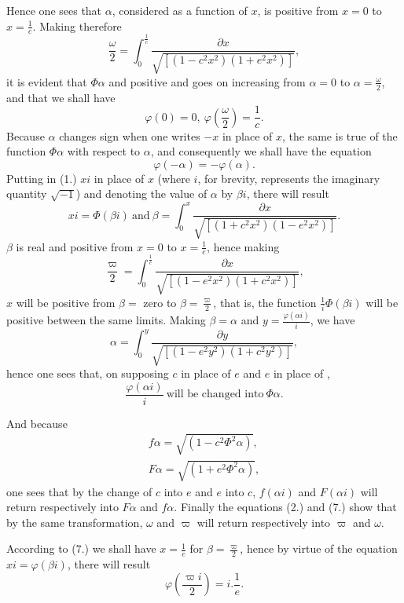 \documentclass{article}
\begin{document}
Hence one sees that $\alpha$, considered as a function of $x$, is positive from $x=0$ to $x=\frac{1}{c}$. Making therefore
\[ \frac{\omega}{2}=\int_{0}^{\frac{1}{c}}\frac{\partial x}{\sqrt{[(1-c^{2}x^{2})(1+e^{2}x^{2})]}}, \tag{3.} \]
it is evident that $\Phi\alpha$ and positive and goes on increasing from $\alpha=0$ to $\alpha=\frac{\omega}{2}$, and that we shall have
\[ \varphi(0)=0,\ \varphi\left(\frac{\omega}{2}\right)=\frac{1}{c}. \tag{4.} \]
Because $\alpha$ changes sign when one writes $-x$ in place of $x$, the same is true of the function $\Phi\alpha$ with respect to $\alpha$, and consequently we shall have the equation
\[ \varphi(-\alpha)=-\varphi(\alpha). \tag{5.} \]
Putting in (1.) $xi$ in place of $x$ (where $i$, for brevity, represents the imaginary quantity $\sqrt{-1}$) and denoting the value of $\alpha$ by $\beta i$, there will result
\[ xi=\Phi(\beta i)\ \text{and}\ \beta=\int_{0}^{x}\frac{\partial x}{\sqrt{[(1+c^{2}x^{2})(1-e^{2}x^{2})]}}. \tag{6.} \]
$\beta$ is real and positive from $x=0$ to $x=\frac{1}{e}$, hence making
\[ \frac{\varpi}{2}=\int_{0}^{\frac{1}{e}}\frac{\partial x}{\sqrt{[(1-e^{2}x^{2})(1+c^{2}x^{2})]}}, \tag{7.} \]
$x$ will be positive from $\beta=$ zero to $\beta=\frac{\varpi}{2}$, that is, the function $\frac{1}{i}\Phi(\beta i)$ will be positive between the same limits. Making $\beta=\alpha$ and $y=\frac{\varphi(\alpha i)}{i}$, we have
\[ \alpha=\int_{0}^{y}\frac{\partial y}{\sqrt{[(1-e^{2}y^{2})(1+c^{2}y^{2})]}}, \]
hence one sees that, on supposing $c$ in place of $e$ and $e$ in place of \uncertain{$\varepsilon$},
\[ \frac{\varphi(\alpha i)}{i}\ \text{will be changed into}\ \Phi\alpha. \]

And because
\[ \begin{gathered} f\alpha=\sqrt{(1-c^{2}\Phi^{2}\alpha)},\\ F\alpha=\sqrt{(1+e^{2}\Phi^{2}\alpha)}, \end{gathered} \]
one sees that by the change of $c$ into $e$ and $e$ into $c$, $f(\alpha i)$ and $F(\alpha i)$ will return respectively into $F\alpha$ and $f\alpha$. Finally the equations (2.) and (7.) show that by the same transformation, $\omega$ and $\varpi$ will return respectively into $\varpi$ and $\omega$.


According to (7.) we shall have $x=\frac{1}{e}$ for $\beta=\frac{\varpi}{2}$, hence by virtue of the equation $xi=\varphi(\beta i)$, there will result
\[ \varphi\left(\frac{\varpi i}{2}\right)=i.\frac{1}{e}. \tag{8.} \]
\end{document}

